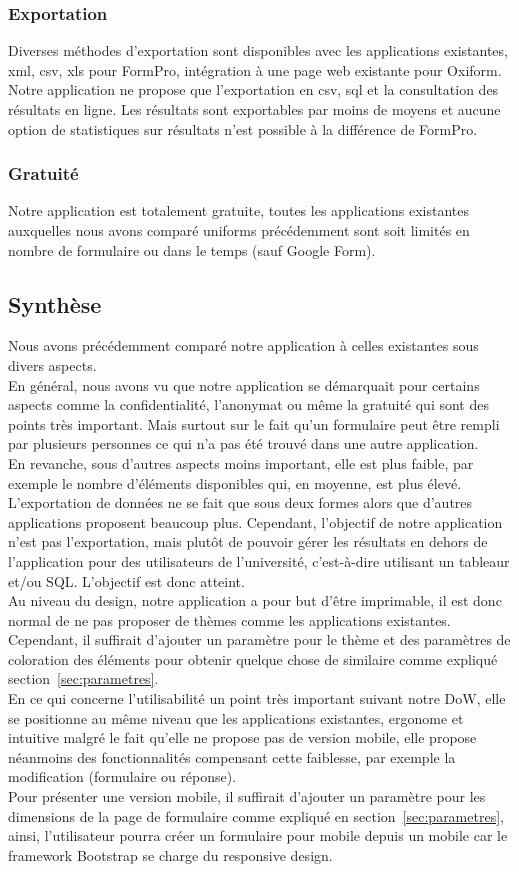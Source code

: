 \documentclass{sigplanconf}
\begin{document}
\subsubsection{Exportation}
Diverses méthodes d’exportation sont disponibles avec les applications existantes, xml, csv, xls pour FormPro\cite{urlFormPro}, intégration à une page web existante pour Oxiform. Notre application ne propose que l’exportation en csv, sql et la consultation des résultats en ligne. Les résultats sont exportables par moins de moyens et aucune option de statistiques sur résultats n’est possible à la différence de FormPro.
\subsubsection{Gratuité}
Notre application est totalement gratuite, toutes les applications existantes auxquelles nous avons comparé uniforms précédemment sont soit limités en nombre de formulaire ou dans le temps (sauf Google Form\cite{urlGoogleForm}).
\subsection{Synthèse}
Nous avons précédemment comparé notre application à celles existantes sous divers aspects.\\ En général, nous avons vu que notre application se démarquait pour certains aspects comme la confidentialité, l’anonymat ou même la gratuité qui sont des points très important. Mais surtout sur le fait qu'un formulaire peut être rempli par plusieurs personnes ce qui n'a pas été trouvé dans une autre application.\\
En revanche, sous d’autres aspects moins important, elle est plus faible, par exemple le nombre d’éléments disponibles qui, en moyenne, est plus élevé. L’exportation de données ne se fait que sous deux formes alors que d’autres applications proposent beaucoup plus. Cependant, l’objectif de notre application n’est pas l’exportation, mais plutôt de pouvoir gérer les résultats en dehors de l’application pour des utilisateurs de l'université, c'est-à-dire utilisant un tableaur et/ou SQL. L’objectif est donc atteint. \\
Au niveau du design, notre application a pour but d’être imprimable, il est donc normal de ne pas proposer de thèmes comme les applications existantes. Cependant, il suffirait d'ajouter un paramètre pour le thème et des paramètres de coloration des éléments pour obtenir quelque chose de similaire comme expliqué section~\ref{sec:parametres}.\\
En ce qui concerne l’utilisabilité un point très important suivant notre DoW, elle se positionne au même niveau que les applications existantes, ergonome et intuitive malgré le fait qu’elle ne propose pas de version mobile, elle propose néanmoins des fonctionnalités compensant cette faiblesse, par exemple la modification (formulaire ou réponse).\\
Pour présenter une version mobile, il suffirait d'ajouter un paramètre pour les dimensions de la page de formulaire comme expliqué en section~\ref{sec:parametres}, ainsi, l'utilisateur pourra créer un formulaire pour mobile depuis un mobile car le framework Bootstrap se charge du responsive design.
\end{document}

